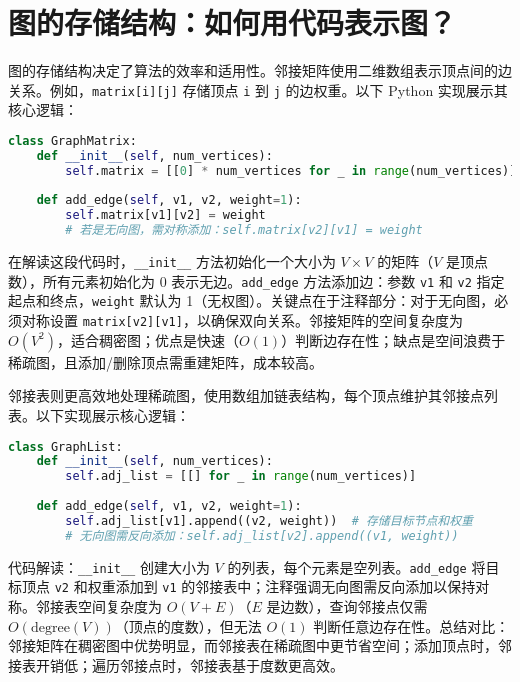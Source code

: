 \chapter{图的存储结构：如何用代码表示图？}
图的存储结构决定了算法的效率和适用性。邻接矩阵使用二维数组表示顶点间的边关系。例如，\texttt{matrix[i][j]} 存储顶点 \texttt{i} 到 \texttt{j} 的边权重。以下 Python 实现展示其核心逻辑：\par
\begin{lstlisting}[language=python]
class GraphMatrix:
    def __init__(self, num_vertices):
        self.matrix = [[0] * num_vertices for _ in range(num_vertices)]
    
    def add_edge(self, v1, v2, weight=1):
        self.matrix[v1][v2] = weight
        # 若是无向图，需对称添加：self.matrix[v2][v1] = weight
\end{lstlisting}
在解读这段代码时，\texttt{\_{}\_{}init\_{}\_{}} 方法初始化一个大小为 $V \times V$ 的矩阵（$V$ 是顶点数），所有元素初始化为 0 表示无边。\texttt{add\_{}edge} 方法添加边：参数 \texttt{v1} 和 \texttt{v2} 指定起点和终点，\texttt{weight} 默认为 1（无权图）。关键点在于注释部分：对于无向图，必须对称设置 \texttt{matrix[v2][v1]}，以确保双向关系。邻接矩阵的空间复杂度为 $O(V^2)$，适合稠密图；优点是快速（$O(1)$）判断边存在性；缺点是空间浪费于稀疏图，且添加/删除顶点需重建矩阵，成本较高。\par
邻接表则更高效地处理稀疏图，使用数组加链表结构，每个顶点维护其邻接点列表。以下实现展示核心逻辑：\par
\begin{lstlisting}[language=python]
class GraphList:
    def __init__(self, num_vertices):
        self.adj_list = [[] for _ in range(num_vertices)]
    
    def add_edge(self, v1, v2, weight=1):
        self.adj_list[v1].append((v2, weight))  # 存储目标节点和权重
        # 无向图需反向添加：self.adj_list[v2].append((v1, weight))
\end{lstlisting}
代码解读：\texttt{\_{}\_{}init\_{}\_{}} 创建大小为 $V$ 的列表，每个元素是空列表。\texttt{add\_{}edge} 将目标顶点 \texttt{v2} 和权重添加到 \texttt{v1} 的邻接表中；注释强调无向图需反向添加以保持对称。邻接表空间复杂度为 $O(V + E)$（$E$ 是边数），查询邻接点仅需 $O(\text{degree}(V))$（顶点的度数），但无法 $O(1)$ 判断任意边存在性。总结对比：邻接矩阵在稠密图中优势明显，而邻接表在稀疏图中更节省空间；添加顶点时，邻接表开销低；遍历邻接点时，邻接表基于度数更高效。\par
